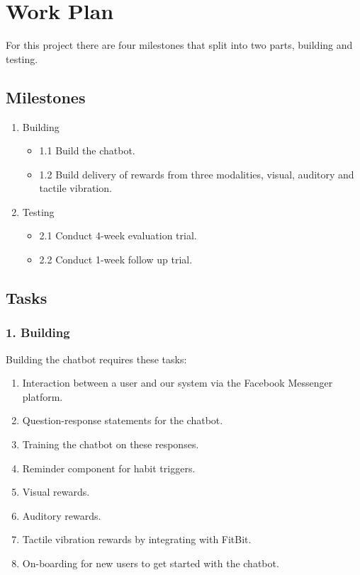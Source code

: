 
\newpage
\section{Work Plan}
For this project there are four milestones that split into two parts, building and testing.


\subsection{Milestones}

\begin{enumerate}
  \item Building
  \begin{itemize}
    \item 1.1 Build the chatbot.
    \item 1.2 Build delivery of rewards from three modalities, visual, auditory and tactile vibration.
  \end{itemize}
  \item Testing
  \begin{itemize}
    \item 2.1 Conduct 4-week evaluation trial.
    \item 2.2 Conduct 1-week follow up trial.
  \end{itemize}
\end{enumerate}

\subsection{Tasks}

\subsubsection*{1. Building}
Building the chatbot requires these tasks:

\begin{enumerate}
  \item Interaction between a user and our system via the Facebook Messenger platform.
  \item Question-response statements for the chatbot.
  \item Training the chatbot on these responses.
  \item Reminder component for habit triggers.
  \item Visual rewards.
  \item Auditory rewards.
  \item Tactile vibration rewards by integrating with FitBit.
  \item On-boarding for new users to get started with the chatbot.
\end{enumerate}

